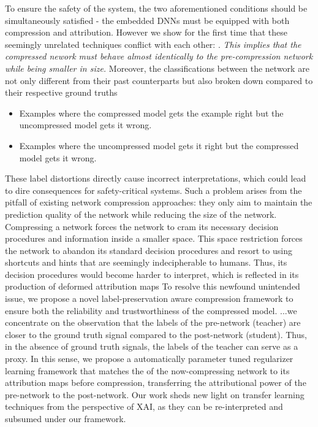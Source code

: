 To ensure the safety of the system, 
the two aforementioned conditions should be simultaneously 
satisfied - the embedded DNNs must be equipped with 
both compression and attribution.
%
%
However we show for the first time that these seemingly
unrelated techniques conflict with each other:
%
%
.
%
%
\textit{This implies that the compressed nework must behave 
almost identically to the pre-compression network while being
smaller in size.}
%
%
Moreover, the classifications between the network are
not only different from their past counterparts 
but also broken down compared to their respective ground truths
%
%
\begin{itemize}
    \item Examples where the compressed model gets the example 
          right but the uncompressed model gets it wrong.
    \item Examples where the uncompressed model gets it right 
          but the compressed model gets it wrong.
\end{itemize}
%
%
These label distortions directly
cause incorrect interpretations, which could lead to dire 
consequences for safety-critical systems.
%
%
Such a problem arises from the pitfall of existing 
network compression approaches: they only
aim to maintain the prediction quality of the network while 
reducing the size of the network.
%
%
Compressing a network forces the network to cram its 
necessary decision procedures and information inside a
smaller space.
%
This space restriction forces the network to abandon its 
standard decision procedures and resort to using shortcuts 
and hints that are seemingly indecipherable to humans.
%
Thus, its decision procedures would become harder to 
interpret, which is reflected in its production of deformed
attribution maps
%
%
To resolve this newfound unintended
issue, we propose a novel label-preservation aware 
compression framework  to ensure both the reliability and 
trustworthiness of the compressed model.
%
...we concentrate on the observation that the labels 
of the pre-network (teacher) are closer to the ground truth signal 
compared to the post-network (student).
%
Thus, in the absence of ground truth signals, the labels
of the teacher can serve as a proxy. 
%
In this sense, we propose a automatically parameter 
tuned regularizer learning framework that matches the 
of the now-compressing network to its attribution maps 
before compression, transferring the attributional power 
of the pre-network to the post-network. Our work sheds 
new light on transfer learning techniques from the perspective of XAI,
as they can be re-interpreted and subsumed under our framework.
